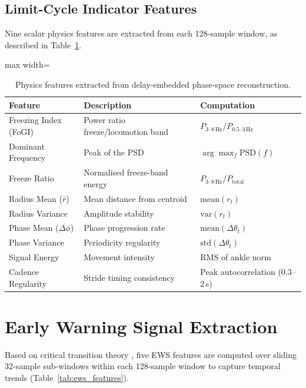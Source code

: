 \documentclass[12pt,a4paper,oneside]{report}
\numberwithin{equation}{chapter}
\numberwithin{figure}{chapter}
\numberwithin{table}{chapter}
\begin{document}
\subsection{Limit-Cycle Indicator Features}

Nine scalar physics features are extracted from each 128-sample window, as described in Table~\ref{tab:physics_features}.

\begin{table}[ht]
\centering
\caption{Physics features extracted from delay-embedded phase-space reconstruction.}
\label{tab:physics_features}
\renewcommand{\arraystretch}{1.3}
\begin{adjustbox}{max width=\textwidth}
\begin{tabular}{p{3.5cm} p{5.5cm} p{5cm}}
\toprule
\textbf{Feature} & \textbf{Description} & \textbf{Computation} \\
\midrule
Freezing Index (FoGI) & Power ratio freeze/locomotion band & $P_{3\text{--}8\,\text{Hz}} / P_{0.5\text{--}3\,\text{Hz}}$ \\
Dominant Frequency & Peak of the PSD & $\arg\max_f \text{PSD}(f)$ \\
Freeze Ratio & Normalised freeze-band energy & $P_{3\text{--}8\,\text{Hz}} / P_{\text{total}}$ \\
Radius Mean ($\bar{r}$) & Mean distance from centroid & $\text{mean}(r_t)$ \\
Radius Variance & Amplitude stability & $\text{var}(r_t)$ \\
Phase Mean ($\overline{\Delta\phi}$) & Phase progression rate & $\text{mean}(\Delta\theta_t)$ \\
Phase Variance & Periodicity regularity & $\text{std}(\Delta\theta_t)$ \\
Signal Energy & Movement intensity & $\text{RMS}$ of ankle norm \\
Cadence Regularity & Stride timing consistency & Peak autocorrelation (0.3--2\,s) \\
\bottomrule
\end{tabular}
\end{adjustbox}
\end{table}

\section{Early Warning Signal Extraction}

Based on critical transition theory \cite{scheffer2009, dakos2012}, five EWS features are computed over sliding 32-sample sub-windows within each 128-sample window to capture temporal trends (Table~\ref{tab:ews_features}).
\end{document}
